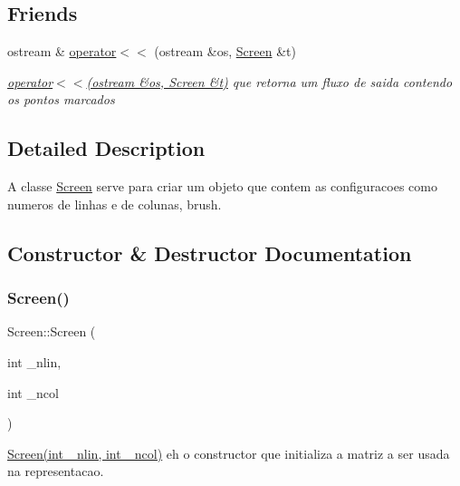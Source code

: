 \subsection*{Friends}
\begin{DoxyCompactItemize}
\item 
\mbox{\label{classScreen_aab6a2880746bfe1b7964817cc8f0989e}} 
ostream \& \hyperlink{classScreen_aab6a2880746bfe1b7964817cc8f0989e}{operator$<$$<$} (ostream \&os, \hyperlink{classScreen}{Screen} \&t)
\begin{DoxyCompactList}\small\item\em \hyperlink{classScreen_aab6a2880746bfe1b7964817cc8f0989e}{operator$<$$<$(ostream \&os, Screen \&t)} que retorna um fluxo de saida contendo os pontos marcados \end{DoxyCompactList}\end{DoxyCompactItemize}


\subsection{Detailed Description}
A classe \hyperlink{classScreen}{Screen} serve para criar um objeto que contem as configuracoes como numeros de linhas e de colunas, brush. 

\subsection{Constructor \& Destructor Documentation}
\mbox{\label{classScreen_a6c21beca43d25854d8674445127ef2eb}} 
\subsubsection{\texorpdfstring{Screen()}{Screen()}}
{\footnotesize\ttfamily Screen\+::\+Screen (\begin{DoxyParamCaption}\item[{int}]{\+\_\+nlin,  }\item[{int}]{\+\_\+ncol }\end{DoxyParamCaption})}



\hyperlink{classScreen_a6c21beca43d25854d8674445127ef2eb}{Screen(int \+\_\+nlin, int \+\_\+ncol)} eh o constructor que initializa a matriz a ser usada na representacao. 


